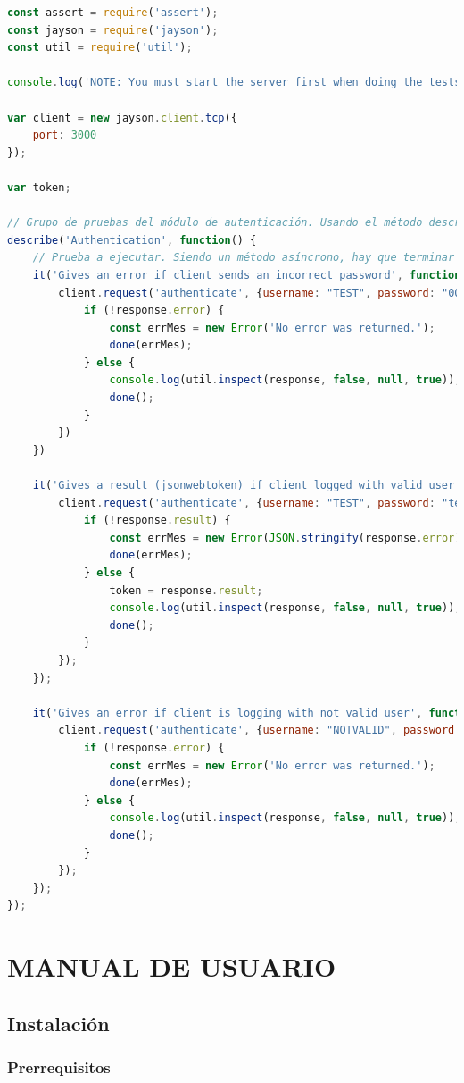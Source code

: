 \documentclass[spanish,12pt, a4paper, twoside]{paper}
\let\oldsection\section
\def\section{\cleardoublepage\oldsection}
\begin{document}
\begin{lstlisting}[language=JavaScript]
const assert = require('assert');
const jayson = require('jayson');
const util = require('util');

console.log('NOTE: You must start the server first when doing the tests.');

var client = new jayson.client.tcp({
	port: 3000
});

var token;

// Grupo de pruebas del módulo de autenticación. Usando el método describe, podemos definir dicho grupo.
describe('Authentication', function() {
	// Prueba a ejecutar. Siendo un método asíncrono, hay que terminar la función llamando al callback done() para éxito o done(Error) para caso de error.
	it('Gives an error if client sends an incorrect password', function(done) {
		client.request('authenticate', {username: "TEST", password: "0000"}, function(err, response) {
			if (!response.error) {
				const errMes = new Error('No error was returned.');
				done(errMes);
			} else {
				console.log(util.inspect(response, false, null, true));
				done();
			}
		})
	})

	it('Gives a result (jsonwebtoken) if client logged with valid user', function(done) {
		client.request('authenticate', {username: "TEST", password: "test"}, function(err, response) {
			if (!response.result) {
				const errMes = new Error(JSON.stringify(response.error));
				done(errMes);
			} else {
				token = response.result;
				console.log(util.inspect(response, false, null, true));
				done();
			}
		});
	});

	it('Gives an error if client is logging with not valid user', function(done) {
		client.request('authenticate', {username: "NOTVALID", password: "notvalid"}, function(err, response) {
			if (!response.error) {
				const errMes = new Error('No error was returned.');
				done(errMes);
			} else {
				console.log(util.inspect(response, false, null, true));
				done();
			}
		});
	});
});
\end{lstlisting}

\section{MANUAL DE USUARIO}

\subsection{Instalación}

\subsubsection{Prerrequisitos}
\end{document}
